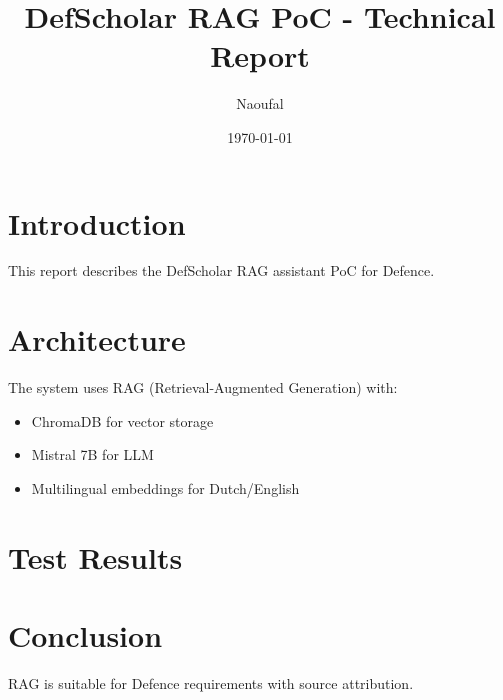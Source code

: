 \documentclass{article}
\title{DefScholar RAG PoC - Technical Report}
\author{Naoufal}
\date{\today}
\begin{document}
\maketitle

\section{Introduction}
This report describes the DefScholar RAG assistant PoC for Defence.

\section{Architecture}
The system uses RAG (Retrieval-Augmented Generation) with:
\begin{itemize}
    \item ChromaDB for vector storage
    \item Mistral 7B for LLM
    \item Multilingual embeddings for Dutch/English
\end{itemize}

\section{Test Results}

\section{Conclusion}
RAG is suitable for Defence requirements with source attribution.
\end{document}
